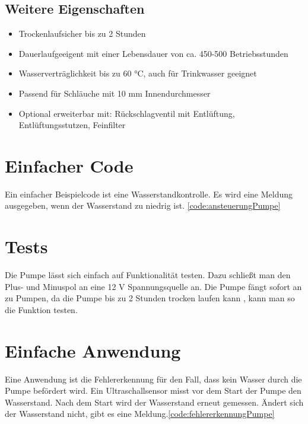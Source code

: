 \subsection{Weitere Eigenschaften}
\begin{itemize}
	\item Trockenlaufsicher bis zu 2 Stunden
	\item Dauerlaufgeeigent mit einer Lebensdauer von ca. 450-500 Betriebsstunden 
	\item Wasserverträglichkeit bis zu 60 °C, auch für Trinkwasser geeignet
	\item Passend für Schläuche mit 10 mm Innendurchmesser
	\item Optional erweiterbar mit: Rückschlagventil mit Entlüftung, Entlüftungsstutzen, Feinfilter 
\end{itemize}
\cite{Comet:2004} \cite{ConradPumpe:2025}


\section{Einfacher Code}
Ein einfacher Beispielcode ist eine Wasserstandkontrolle. Es wird eine Meldung ausgegeben, wenn der Wasserstand zu niedrig ist. \ref{code:ansteuerungPumpe}

\begin{code}[H]
	\caption{Einfacher Code zur Ansteuerung einer Pumpe}
	\label{code:ansteuerungPumpe}
\end{code}

\section{Tests}
Die Pumpe lässt sich einfach auf Funktionalität testen. Dazu schließt man den Plus- und Minuspol an eine 12 V Spannungsquelle an. Die Pumpe fängt sofort an zu Pumpen, da die Pumpe bis zu 2 Stunden trocken laufen kann \cite{Comet:2004}, kann man so die Funktion testen.

\section{Einfache Anwendung}
Eine Anwendung ist die Fehlererkennung für den Fall, dass kein Wasser durch die Pumpe befördert wird. 
Ein Ultraschallsensor misst vor dem Start der Pumpe den Wasserstand. Nach dem Start wird der Wasserstand erneut gemessen. Ändert sich der Wasserstand nicht, gibt es eine Meldung.\ref{code:fehlererkennungPumpe}

